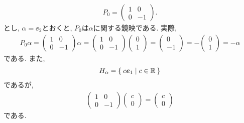 \begin{example}
  \begin{align*}
    P_0=
    \begin{pmatrix}
      1 & 0 \\
      0 & -1 
    \end{pmatrix}.
  \end{align*}
  とし,
  $\alpha=\ee_2$とおくと,
  $P_0$は$\alpha$に関する鏡映である.
実際, 
\begin{align*}
  P_0\alpha = 
      \begin{pmatrix}
      1 & 0 \\
      0 & -1 
      \end{pmatrix}
      \alpha
    =
      \begin{pmatrix}
      1 & 0 \\
      0 & -1 
    \end{pmatrix}
    \begin{pmatrix}
      0  \\
      1  
    \end{pmatrix}
    =
    \begin{pmatrix}
      0  \\
      -1  
    \end{pmatrix}
    =
    -
    \begin{pmatrix}
      0  \\
      1  
    \end{pmatrix}
    =
    -\alpha
\end{align*}
である.  また,
\begin{align*}
  H_\alpha = \Set{c \boldsymbol{e}_1 | c\in \mathbb{R}}
\end{align*}
であるが,
\begin{align*}
    \begin{pmatrix}
      1 & 0 \\
      0 & -1 
    \end{pmatrix}
    \begin{pmatrix}
      c  \\
      0  
    \end{pmatrix}
    =
    \begin{pmatrix}
      c  \\
      0  
    \end{pmatrix}
\end{align*}
である.
\end{example}

